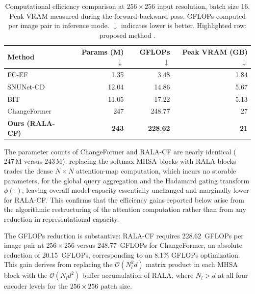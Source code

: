 \begin{table}[htbp]
\centering
\caption{Computational efficiency comparison at $256 \times 256$ input resolution, batch size 16. Peak \ac{VRAM} measured during the forward-backward pass. \ac{GFLOPs} computed per image pair in inference mode. $\downarrow$ indicates lower is better. \colorbox{pastelorange}{Highlighted} row: proposed method \cite{acuna2026efficient}.}
\label{tab:efficiency}
\renewcommand{\arraystretch}{1.15} {\small
\begin{tabularx}{\textwidth}{|X|r|r|r|}
\hline
\textbf{Method}
    & \textbf{Params (M)} $\downarrow$
    & \textbf{\ac{GFLOPs}} $\downarrow$
    & \textbf{Peak \ac{VRAM} (GB)} $\downarrow$ \\
\hline\hline
FC-EF \cite{Daudt2018SiamICIP}         &  1.35 &   3.48 &  1.84 \\
\hline
SNUNet-CD \cite{Fang2021SNUNetCD}      & 12.04 &  14.86 &  5.67 \\
\hline
BIT \cite{Chen2022BIT}                 & 11.05 &  17.22 &  5.13 \\
\hline
ChangeFormer \cite{Bandara2022ChangeFormer} & 247 & 248.77 & 27 \\
\hline
\rowcolor{pastelorange}
\textbf{Ours (RALA-CF)} & \textbf{243} & \textbf{228.62} & \textbf{21} \\
\hline
\end{tabularx}
}
\end{table}

The parameter counts of ChangeFormer and \ac{RALA-CF} are nearly identical ($247\,\mathrm{M}$ versus $243\,\mathrm{M}$): replacing the softmax \ac{MHSA} blocks with \ac{RALA} blocks trades the dense $N \times N$ attention-map computation, which incurs no storable parameters, for the global query aggregation and the Hadamard gating transform $\phi(\cdot)$, leaving overall model capacity essentially unchanged and marginally lower for \ac{RALA-CF}. This confirms that the efficiency gains reported below arise from the algorithmic restructuring of the attention computation rather than from any reduction in representational capacity.

The \ac{GFLOPs} reduction is substantive: \ac{RALA-CF} requires 228.62~\ac{GFLOPs} per image pair at $256 \times 256$ versus 248.77~\ac{GFLOPs} for ChangeFormer, an absolute reduction of 20.15~\ac{GFLOPs}, corresponding to an 8.1\% \ac{GFLOPs} optimization. This gain derives from replacing the $\mathcal{O}(N_l^2 d)$ matrix product in each \ac{MHSA} block with the $\mathcal{O}(N_l d^2)$ buffer accumulation of \ac{RALA}, where $N_l > d$ at all four encoder levels for the $256 \times 256$ patch size.

